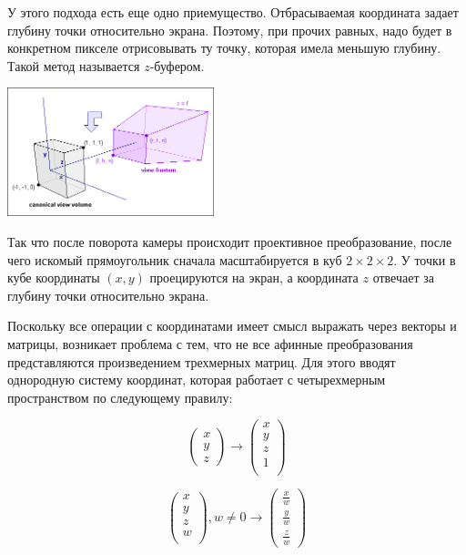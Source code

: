 \documentclass{article}
\begin{document}
У этого подхода есть еще одно приемущество. Отбрасываемая координата задает глубину точки относительно экрана. Поэтому, при прочих равных, надо будет в конкретном пикселе отрисовывать ту точку, которая имела меньшую глубину. Такой метод называется $z$-буфером.

\begin{center}
\includegraphics[width=6cm]{z-buffer.png}
\end{center}

Так что после поворота камеры происходит проективное преобразование, после чего искомый прямоугольник сначала масштабируется в куб $2 \times 2 \times 2$. У точки в кубе координаты $(x, y)$ проецируются на экран, а координата $z$ отвечает за глубину точки относительно экрана. 


Поскольку все операции с координатами имеет смысл выражать через векторы и матрицы, возникает проблема с тем, что не все афинные преобразования представляются произведением трехмерных матриц. Для этого вводят однородную систему координат, которая работает с четырехмерным пространством по следующему правилу:

$$\begin{pmatrix} x \\ y \\ z \end{pmatrix} \to \begin{pmatrix}x \\ y \\ z \\ 1\\ \end{pmatrix}$$

$$\begin{pmatrix}x \\ y \\ z \\ w\\ \end{pmatrix}, w \neq 0 \to \begin{pmatrix} \frac{x}{w} \\ \frac{y}{w} \\ \frac{z}{w}\end{pmatrix}$$
\end{document}

